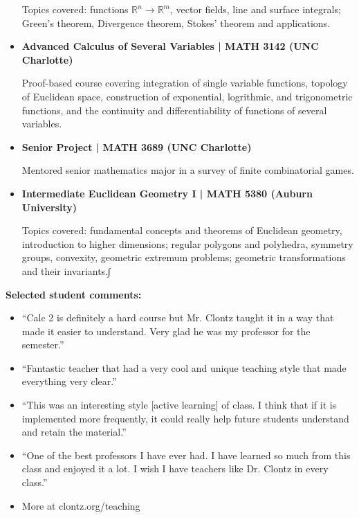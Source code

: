 \documentclass{article}
\begin{document}
\begin{itemize}
    Topics covered: functions \(\mathbb R^n\to\mathbb R^m\), vector fields,
    line and surface integrals; Green's theorem, Divergence theorem,
    Stokes' theorem and applications.

  \item
    \textbf{Advanced Calculus of Several Variables | MATH 3142 (UNC Charlotte)}

      Proof-based course covering integration of single variable functions,
      topology of Euclidean space, construction of exponential, logrithmic,
      and trigonometric functions, and the
      continuity and differentiability of functions of several variables.


  \item
    \textbf{Senior Project | MATH 3689 (UNC Charlotte)}

    Mentored senior mathematics major in a survey of finite combinatorial games.
  \item
    \textbf{Intermediate Euclidean Geometry I | MATH 5380 (Auburn University)}

    Topics covered: fundamental concepts and theorems of Euclidean geometry,
    introduction to higher dimensions; regular polygons and polyhedra,
    symmetry groups, convexity, geometric extremum problems; geometric
    transformations and their invariants.∫

\end{itemize}

\noindent
\textbf{Selected student comments:}
    \begin{itemize}
      \item ``Calc 2 is definitely a hard course but Mr. Clontz taught it in a way that made it easier to understand. Very glad he was my professor for the semester.''
      \item ``Fantastic teacher that had a very cool and unique teaching style that made everything very clear.''
      \item ``This was an interesting style [active learning] of class. I think that if it is implemented more frequently, it could really help future students understand and retain the material.''
      \item ``One of the best professors I have ever had. I have learned so much from this class and enjoyed it a lot. I wish I have teachers like Dr. Clontz in every class.''
      \item More at clontz.org/teaching
    \end{itemize}


\vfill
\newpage
\end{document}
